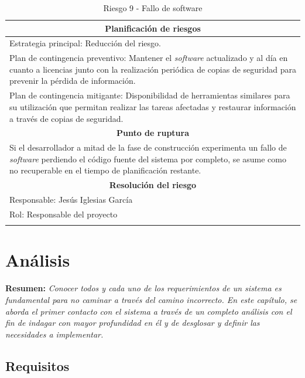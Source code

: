 \documentclass[12pt,a4paper, twoside]{report}
\begin{document}
\begin{longtable}{m{4cm}|m{5cm}|m{4cm}}
		\multicolumn{3}{|c|}{\textbf{Planificación de riesgos}} \\ \hline \hline
		\multicolumn{3}{|p{17cm}|}{Estrategia principal: Reducción del riesgo.} \\ \hline
		\multicolumn{3}{|p{17cm}|}{Plan de contingencia preventivo: Mantener el \textit{software} actualizado y al día en cuanto a licencias junto con la realización periódica de copias de seguridad para prevenir la pérdida de información.} \\ \hline
		\multicolumn{3}{|p{17cm}|}{Plan de contingencia mitigante: Disponibilidad de herramientas similares para su utilización que permitan realizar las tareas afectadas y restaurar información a través de copias de seguridad.} \\ \hline
			
		\multicolumn{3}{|c|}{\textbf{Punto de ruptura}} \\ \hline \hline
		\multicolumn{3}{|p{17cm}|}{Si el desarrollador a mitad de la fase de construcción experimenta un fallo de \textit{software} perdiendo el código fuente del sistema por completo, se asume como no recuperable en el tiempo de planificación restante.}\\ \hline
			
		\multicolumn{3}{|c|}{\textbf{Resolución del riesgo}} \\ \hline \hline
		\multicolumn{3}{|p{17cm}|}{Responsable: Jesús Iglesias García}\\ \hline
		\multicolumn{3}{|p{17cm}|}{Rol: Responsable del proyecto} \\ \hline
		\caption{Riesgo 9 - Fallo de software}	
	\end{longtable}
			
	\chapter{Análisis} \label{analysisChapter}
	
	\textbf{Resumen:} \textit{Conocer todos y cada uno de los requerimientos de un sistema es fundamental para no caminar a través del camino incorrecto. En este capítulo, se aborda el primer contacto con el sistema a través de un completo análisis con el fin de indagar con mayor profundidad en él y de desglosar y definir las necesidades a implementar.}

	\section{Requisitos} %
\end{document}
